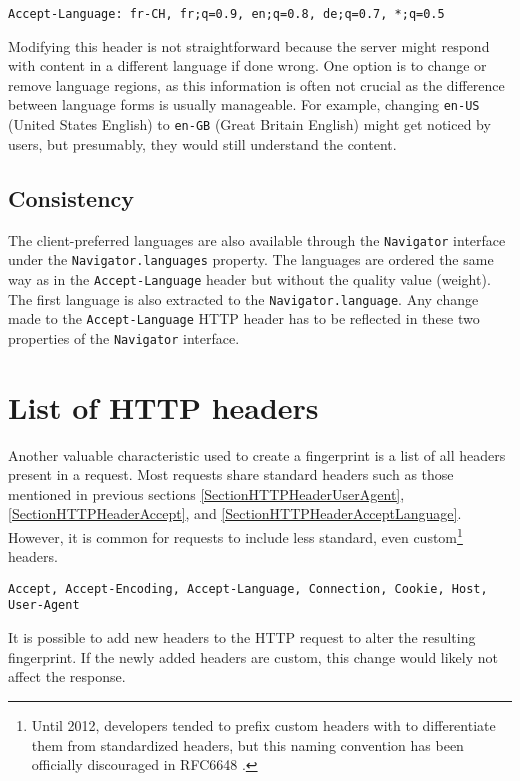 \bigbreak

\begin{lstlisting}[caption={An example of Accept-Language header contents \cite{MDNHeaderAcceptLanguage}.}]
Accept-Language: fr-CH, fr;q=0.9, en;q=0.8, de;q=0.7, *;q=0.5
\end{lstlisting}

\medbreak

Modifying this header is not straightforward because the server might respond with content in a different language if done wrong. One option is to change or remove language regions, as this information is often not crucial as the difference between language forms is usually manageable. For example, changing \texttt{en-US} (United States English) to \texttt{en-GB} (Great Britain English) might get noticed by users, but presumably, they would still understand the content.

\subsection{Consistency}

The client-preferred languages are also available through the \texttt{Navigator} interface under the \texttt{Navigator.languages} property. The languages are ordered the same way as in the \texttt{Accept-Language} header but without the quality value (weight). The first language is also extracted to the \texttt{Navigator.language}. Any change made to the \texttt{Accept-Language} HTTP header has to be reflected in these two properties of the \texttt{Navigator} interface.

\section{List of HTTP headers}

Another valuable characteristic used to create a fingerprint is a list of all headers present in a request. Most requests share standard headers such as those mentioned in previous sections \ref{SectionHTTPHeaderUserAgent}, \ref{SectionHTTPHeaderAccept}, and \ref{SectionHTTPHeaderAcceptLanguage}. However, it is common for requests to include less standard, even custom\footnote{Until 2012, developers tended to prefix custom headers with  to differentiate them from standardized headers, but this naming convention has been officially discouraged in RFC6648 \cite{RFC6648}.} headers.

\bigbreak

\begin{lstlisting}[caption={An example of a list of headers present in an HTTP request.}]
Accept, Accept-Encoding, Accept-Language, Connection, Cookie, Host, User-Agent
\end{lstlisting}

\medbreak

It is possible to add new headers to the HTTP request to alter the resulting fingerprint. If the newly added headers are custom, this change would likely not affect the response.

% 